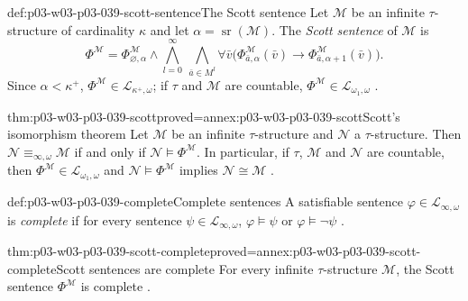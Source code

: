 \begin{hbdefinition}{def:p03-w03-p03-039-scott-sentence}{The Scott sentence}
Let \(\mathcal M\) be an infinite \(\tau\)-structure of cardinality \(\kappa\)
and let \(\alpha=\operatorname{sr}(\mathcal M)\). The \emph{Scott sentence} of
\(\mathcal M\) is
\[
 \Phi^{\mathcal M}=\Phi^{\mathcal M}_{\varnothing,\alpha}\land
 \bigwedge_{l=0}^{\infty}\ \bigwedge_{\bar a\in M^l}
 \forall\bar v\bigl(\Phi^{\mathcal M}_{\bar a,\alpha}(\bar v)\to
                    \Phi^{\mathcal M}_{\bar a,\alpha+1}(\bar v)\bigr).
\]
Since \(\alpha<\kappa^+\), \(\Phi^{\mathcal M}\in\mathcal L_{\kappa^+,\omega}\);
if \(\tau\) and \(\mathcal M\) are countable, \(\Phi^{\mathcal M}\in\mathcal L_{\omega_1,\omega}\)
\cite[p.~19]{Marker2014InfinitaryNotes}.
\end{hbdefinition}

\begin{hbtheorem}{thm:p03-w03-p03-039-scott}{proved=annex:p03-w03-p03-039-scott}{Scott's isomorphism theorem}
Let \(\mathcal M\) be an infinite \(\tau\)-structure and \(\mathcal N\) a
\(\tau\)-structure. Then \(\mathcal N\equiv_{\infty,\omega}\mathcal M\) if and
only if \(\mathcal N\models\Phi^{\mathcal M}\). In particular, if \(\tau\),
\(\mathcal M\) and \(\mathcal N\) are countable, then
\(\Phi^{\mathcal M}\in\mathcal L_{\omega_1,\omega}\) and
\(\mathcal N\models\Phi^{\mathcal M}\) implies \(\mathcal N\cong\mathcal M\)
\cite[Thm.~2.22, pp.~19--20]{Marker2014InfinitaryNotes}.
\end{hbtheorem}

\begin{hbdefinition}{def:p03-w03-p03-039-complete}{Complete sentences}
A satisfiable sentence \(\varphi\in\mathcal L_{\infty,\omega}\) is
\emph{complete} if for every sentence \(\psi\in\mathcal L_{\infty,\omega}\),
\(\varphi\models\psi\) or \(\varphi\models\neg\psi\)
\cite[Def.~2.25, p.~20]{Marker2014InfinitaryNotes}.
\end{hbdefinition}

\begin{hbcorollary}{thm:p03-w03-p03-039-scott-complete}{proved=annex:p03-w03-p03-039-scott-complete}{Scott sentences are complete}
For every infinite \(\tau\)-structure \(\mathcal M\), the Scott sentence
\(\Phi^{\mathcal M}\) is complete
\cite[Cor.~2.26, p.~20]{Marker2014InfinitaryNotes}.
\end{hbcorollary}

